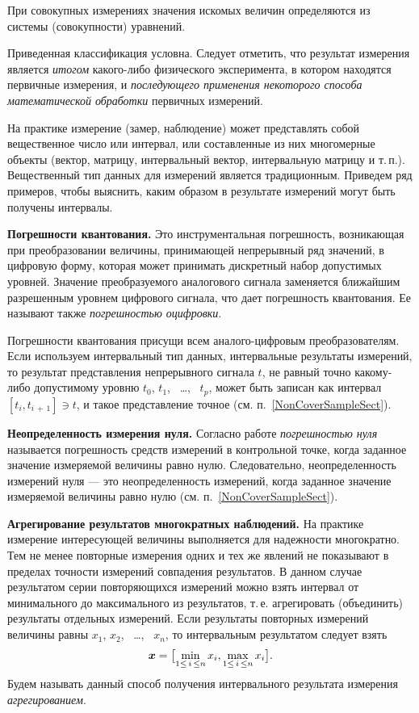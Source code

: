 \documentclass[a5paper,openany]{book}
\newcommand{\mbf}[1]{\protect\text{\boldmath$#1$}}
\begin{document}
{При совокупных измерениях значения искомых величин определяются из системы (совокупности)   уравнений. 


Приведенная классификация условна. Следует отметить, что результат измерения является \emph{итогом} какого-либо физического эксперимента, в котором находятся первичные измерения, и \emph{последующего применения некоторого способа	математической обработки} первичных измерений. 

На практике измерение (замер, наблюдение) может представлять собой вещественное число или интервал, или составленные из них многомерные объекты (вектор, матрицу, интервальный вектор, 
интервальную матрицу и т.\,п.). 
Вещественный тип данных для измерений является традиционным. 
Приведем ряд примеров, чтобы выяснить, каким образом в результате измерений могут быть получены интервалы.

{\bf Погрешности квантования.}  
Это инструментальная погрешность, возникающая при преобразовании величины, принимающей 
непрерывный ряд значений, в цифровую форму, которая может принимать дискретный набор 
допустимых уровней. Значение преобразуемого аналогового сигнала 
заменяется ближайшим разрешенным уровнем цифрового сигнала, что дает  погрешность квантования.  
Ее называют также \emph{погрешностью оцифровки}. 

Погрешности квантования присущи всем аналого-цифровым преобразователям. Если используем интервальный тип данных, интервальные результаты измерений, то результат представления непрерывного сигнала $t$, 
не равный точно какому-либо допустимому уровню $t_0$, $t_1$, \ \ldots, \ $t_p$, может быть 
записан как интервал $[t_{i}, t_{i \, + \, 1}]\ni t$,  и такое представление точное (см. п.~\ref{NonCoverSampleSect}).

{\bf Неопределенность измерения нуля.}
Согласно  работе \cite{RMG29-2013} \emph{погрешностью нуля} называется погрешность средств 
измерений в контрольной точке, когда заданное значение измеряемой величины равно нулю. 
 Следовательно, неопределенность измерений нуля --- это 
неопределенность измерений, когда заданное значение измеряемой величины равно нулю (см. п.~\ref{NonCoverSampleSect}). 

{\bf Агрегирование результатов многократных наблюдений.} 
На практике измерение интересующей величины выполняется 
для надежности многократно. Тем не менее повторные измерения одних и тех же 
явлений не показывают  в пределах точности измерений совпадения результатов. 
В  данном случае результатом серии повторяющихся измерений можно взять интервал 
от минимального до максимального из результатов, т.\,е. агрегировать 
(объединить) результаты отдельных измерений.  
Если результаты повторных измерений величины равны $x_1$, $x_2$, \
\ldots, \ $x_n$, то интервальным результатом следует взять 
\begin{equation*} 
	\mbf{x} = \bigl[\min_{1\leq \,i \,\leq n} x_{i}, \max_{1\leq \,i \,\leq n} x_{i}\bigr].  
\end{equation*} 
Будем называть данный способ получения интервального результата измерения 
\emph{агрегированием}. 

}
\end{document}
